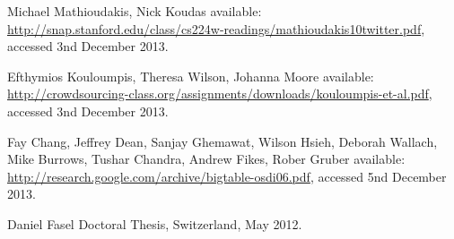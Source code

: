 \documentclass[a4paper]{article}
\begin{document}
\begin{thebibliography}{20}
	Michael Mathioudakis, Nick Koudas
	\newblock available: \url{http://snap.stanford.edu/class/cs224w-readings/mathioudakis10twitter.pdf}, accessed 3nd December 2013.
	
	Efthymios Kouloumpis, Theresa Wilson, Johanna Moore
	\newblock available: \url{http://crowdsourcing-class.org/assignments/downloads/kouloumpis-et-al.pdf}, accessed 3nd December 2013.

	Fay Chang, Jeffrey Dean, Sanjay Ghemawat, Wilson Hsieh, Deborah Wallach, Mike Burrows, Tushar Chandra, Andrew Fikes, Rober Gruber
	\newblock available: \url{http://research.google.com/archive/bigtable-osdi06.pdf}, accessed 5nd December 2013.
	
	Daniel Fasel
	\newblock Doctoral Thesis, Switzerland, May 2012.

	\newblock{}
	\newblock{}
	
\end{thebibliography}
\end{document}
